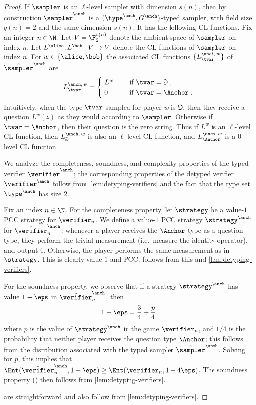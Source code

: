 \begin{proof}
If $\sampler$ is an $\ell$-level sampler with dimension $s(n)$, then by construction $\tsanch$ is a $(\type^\anch, G^\anch)$-typed sampler, with
field size $q(n) = 2$ and the same dimension $s(n)$. It has the following CL functions. Fix an integer $n \in \N$.
Let $V = \F_2^{s(n)}$ denote the ambient space of $\sampler$ on index $n$.
Let $L^\alice, L^\bob: V \to V$ denote the CL functions of $\sampler$ on index
$n$.
For $w\in\{\alice,\bob\}$ the associated CL functions $\{ L^{\anch,\, w}_\tvar
\}$ of $\tsanch$ are
\begin{equation*}
	L^{\anch,\, w}_\tvar =
  \begin{cases}
		 \; L^w & \quad \text{ if } \tvar = \Game \;, \\
		 \; 0 & \quad \text{ if } \tvar = \Anchor \;.
	\end{cases}
\end{equation*}
Intuitively, when the type $\tvar$ sampled for player $w$ is $\Game$, then they
receive a question $L^w(z)$ as they would according to $\sampler$.
Otherwise if $\tvar = \Anchor$, then their question is the zero string.
Thus if $L^w$ is an $\ell$-level CL function, then $L^{\anch,\, w}_\Game$ is
also an $\ell$-level CL function, and $L^{\anch,\, w}_\Anchor$ is a $0$-level CL
function.

  We analyze the completeness, soundness, and complexity properties of the typed
  verifier $\tvanch$; the corresponding properties of the
  detyped verifier $\vanch$ follow from
  \cref{lem:detyping-verifiers} and the fact that the type set
  $\type^\anch$ has size $2$.

  Fix an index $n \in \N$.
  For the completeness property, let $\strategy$ be a value-$1$ PCC strategy for
  $\verifier_n$.
  We define a value-$1$ PCC strategy $\strategy^\anch$ for
  $\tvanch_n$: whenever a player receives the $\Anchor$ type as
  a question type, they perform the trivial measurement (i.e.\ measure the
  identity operator), and output $0$.
  Otherwise, the player performs the same measurement as in $\strategy$.
  This is clearly value-$1$ and PCC.
   follows from this and
  \cref{lem:detyping-verifiers}.

  For the soundness property, we observe that if a strategy $\strategy^\anch$
  has value $1 - \eps$ in $\tvanch_n$, then
  \[ 1 - \eps = \frac{3}{4} + \frac{p}{4} \]
  where $p$ is the value of $\strategy^\anch$ in the game $\verifier_n$, and
  $1/4$ is the probability that neither player receives the question
  type $\Anchor$; this follows from the distribution associated with the typed
  sampler $\tsanch$.
  Solving for $p$, this implies that $\Ent(\tvanch_n,1 - \eps) \geq \Ent(\verifier_n,1 - 4\eps)$.
  The soundness property () then follows from \cref{lem:detyping-verifiers}.
  


   are
  straightforward and also follow from \cref{lem:detyping-verifiers}.
\end{proof}

